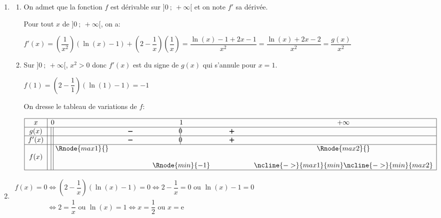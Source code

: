 \documentclass[10pt]{article}
\providecommand{\e}{{\mathrm{e}}}
\begin{document}
\begin{enumerate}
\item 
	\begin{enumerate}
		\item On admet que la fonction $f$ est dérivable sur $]0~;~ +\infty[$ et on note $f'$ sa dérivée.



Pour tout $x$ de $]0~;~ +\infty[$, on a:

$f'(x) = \left (\dfrac{1}{x^2}\right )\left (\ln(x)-1\right ) + \left (2-\dfrac{1}{x}\right )\left (\dfrac{1}{x}\right )
= \dfrac{\ln(x)-1 +2x-1}{x^2}
= \dfrac{\ln(x)+2x-2}{x^2}
=\dfrac{g(x)}{x^2}$

		\item 
Sur $]0~;~ +\infty[$, $x^2>0$ donc $f'(x)$ est du signe de $g(x)$ qui s'annule pour $x=1$.

$f(1) = \left (2-\dfrac{1}{1}\right )\left (\ln(1)-1\right ) = -1$

On dresse le tableau de variations de $f$:

\begin{center}
{\renewcommand{\arraystretch}{1.3}
\def\esp{\hspace*{1.5cm}}
\def\hauteur{0pt}
$\begin{array}{|c| l *3{c} c|}
\hline
 x & 0 & \esp & 1 & \esp & +\infty \\
 \hline
g(x) & \vline\;\vline\; &  \pmb{-} & \vline\hspace{-2.7pt}0 & \pmb{+} & \\  
\hline
f'(x) &  \vline\;\vline\;  &  \pmb{-} & \vline\hspace{-2.7pt}0 & \pmb{+} & \\  
\hline
  & \vline\;\vline\;  \Rnode{max1}{}  &  &  &  & \Rnode{max2}{}   \\
f(x) & \vline\;\vline\;  &  & & &  \rule{0pt}{\hauteur} \\
 &  \vline\;\vline\;  & &   \Rnode{min}{-1} & & \rule{0pt}{\hauteur}
\ncline{->}{max1}{min} \ncline{->}{min}{max2}\\
\hline
\end{array}$
}
\end{center}		
		
	\end{enumerate}
\item  
$\begin{gathered}f(x)=0 \iff \left (2-\dfrac{1}{x}\right )\left ( \ln(x)-1\right )=0
\iff 2-\dfrac{1}{x}=0 \text{ ou } \ln(x)-1=0\\[5pt]
\phantom{f(x)=0}
\iff 2=\dfrac{1}{x} \text{ ou } \ln(x)=1
\iff x=\dfrac{1}{2} \text{ ou } x=\e\end{gathered}$


\end{enumerate}
\end{document}
